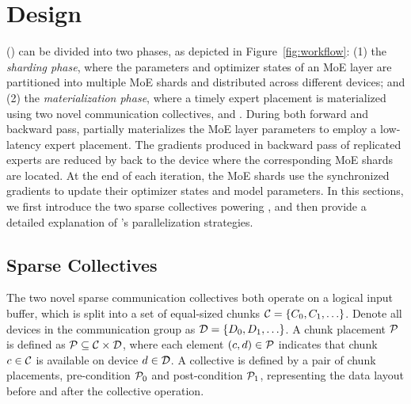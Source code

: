

\section{\yyy Design}\label{sec:design}

\YYY (\yyy) can be divided into two phases, as depicted in Figure~\ref{fig:workflow}: (1) the \textit{sharding phase}, where the parameters and optimizer states of an MoE layer are partitioned into multiple MoE shards and distributed across different devices; and (2) the \textit{materialization phase}, where a timely expert placement is materialized using two novel communication collectives, \collsag and \collsrs. During both forward and backward pass, \collsag partially materializes the MoE layer parameters to employ a low-latency expert placement. The gradients produced in backward pass of replicated experts are reduced by \collsrs back to the device where the corresponding MoE shards are located. At the end of each iteration, the MoE shards use the synchronized gradients to update their optimizer states and model parameters. In this sections, we first introduce the two sparse collectives powering \yyy, and then provide a detailed explanation of \yyy's parallelization strategies.

\subsection{Sparse Collectives}\label{sec:design:spcoll}

The two novel sparse communication collectives both operate on a logical input buffer, which is split into a set of equal-sized chunks $\mathcal{C} = \{C_0, C_1, \ldots\}$.
Denote all devices in the communication group as $\mathcal{D} = \{D_0, D_1, \ldots\}$. 
A chunk placement $\mathcal{P}$ is defined as $\mathcal{P} \subseteq \mathcal{C} \times \mathcal{D}$, where each element $(c, d) \in \mathcal{P}$ indicates that chunk $c \in \mathcal{C}$ is available on device $d \in \mathcal{D}$.
A collective is defined by a pair of chunk placements, pre-condition $\mathcal{P}_0$ and post-condition $\mathcal{P}_1$, representing the data layout before and after the collective operation.



